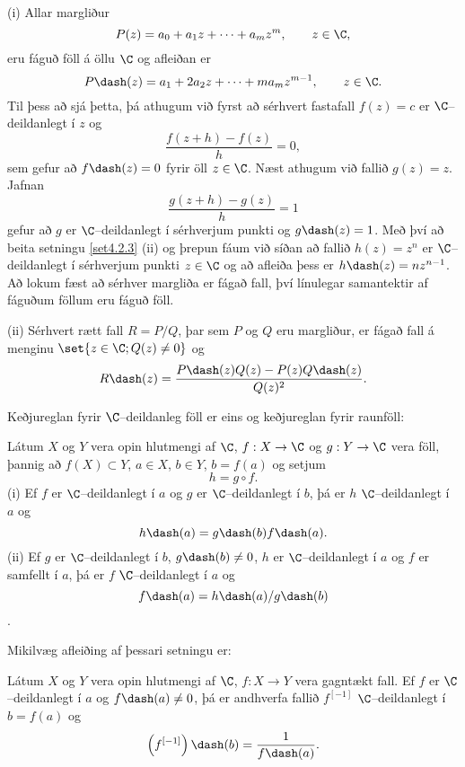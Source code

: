 \begin{sy} (i) Allar margliður
 $$P(z)= a_0+a_1z+\cdots+a_mz^m, \qquad z\in \C,
 $$
eru fáguð föll á öllu $\C$ og afleiðan er
 $$P\dash(z)= a_1+2a_2z+\cdots+ma_mz^{m-1}, \qquad z\in \C.
 $$
Til þess að sjá þetta, þá athugum við fyrst að sérhvert fastafall
$f(z)=c$ er $\C$--deildanlegt í $z$ og 
 $$\dfrac {f(z+h)-f(z)}h=0,
 $$
sem gefur að $f\dash(z)=0$ fyrir öll $z\in \C$.  Næst athugum við 
fallið $g(z)=z$. Jafnan
 $$\dfrac{g(z+h)-g(z)}h=1
 $$
gefur að $g$ er $\C$--deildanlegt í sérhverjum punkti og
$g\dash(z)=1$.  Með því að beita setningu \ref{set4.2.3} (ii) og
þrepun fáum við síðan að fallið $h(z)=z^n$ er
$\C$--deildanlegt í sérhverjum punkti $z\in \C$ og að afleiða þess er
$h\dash(z)=nz^{n-1}$.  Að lokum fæst að sérhver margliða er fágað
fall, því línulegar samantektir af fáguðum föllum eru fáguð föll.


(ii) Sérhvert rætt fall $R=P/Q$, þar sem $P$ og $Q$ eru margliður, er
fágað fall á menginu $\set{z\in \C; Q(z)\neq 0}$
og
 $$R\dash(z)= \dfrac{P\dash(z)Q(z)-P(z)Q\dash(z)}{Q(z)^2}.
 $$
\end{sy}


Keðjureglan fyrir $\C$--deildanleg
föll er  eins og keðjureglan fyrir  raunföll:

\begin{se}\label{se:2.2.6}  Látum $X$ og $Y$ vera opin hlutmengi af $\C$, $f:X\to \C$ og
$g:Y\to \C$ vera föll, þannig að $f(X)\subset Y$, $a\in X$, $b\in Y$,
$b=f(a)$ og setjum
$$h=g\circ f.
$$ 
(i) Ef $f$ er $\C$--deildanlegt í $a$ og $g$ er $\C$--deildanlegt í
$b$, þá er $h$ $\C$--deildanlegt í $a$ og
 $$h\dash(a)=g\dash(b)f\dash(a).
 $$
(ii) Ef $g$ er $\C$--deildanlegt í $b$, $g\dash(b)\neq 0$, $h$ er
$\C$--deildanlegt í $a$ og $f$ er samfellt í $a$, 
þá er $f$ $\C$--deildanlegt í $a$ og 
$$ f\dash(a)=h\dash(a)/g\dash(b)$$.
 
\end{se}

Mikilvæg afleiðing af þessari setningu er:

\begin{fs}\label{fs:2.2.7}  
Látum $X$ og $Y$ vera opin hlutmengi af $\C$, $f:X\to Y$ 
vera gagntækt fall.  Ef $f$ er $\C$--deildanlegt í $a$ og
$f\dash(a)\neq 0$, þá er andhverfa fallið 
$f^{[-1]}$ $\C$--deildanlegt í $b=f(a)$ og
 \begin{equation*}\left(f^{[-1]}\right)\dash(b)= \dfrac 1{f\dash(a)}.\label{4.2.4}
 \end{equation*}
\end{fs}



